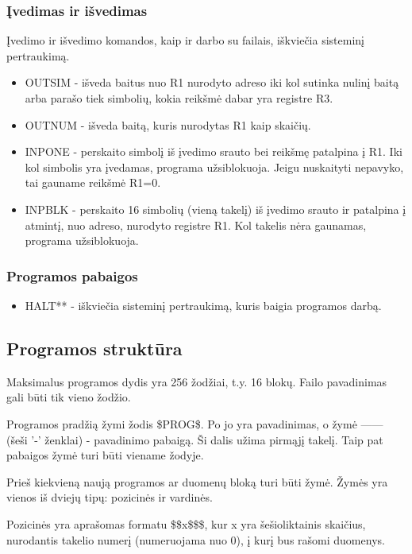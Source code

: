 \documentclass{VUMIFInfKursinis}
\begin{document}
\subsubsection{Įvedimas ir išvedimas}
Įvedimo ir išvedimo komandos, kaip ir darbo su failais, iškviečia sisteminį pertraukimą. 
\begin{itemize}
	\item OUTSIM - išveda baitus nuo R1 nurodyto adreso iki kol sutinka nulinį baitą arba parašo tiek simbolių, kokia reikšmė dabar yra registre R3.
	\item OUTNUM - išveda baitą, kuris nurodytas R1 kaip skaičių.
	\item INPONE - perskaito simbolį iš įvedimo srauto bei reikšmę patalpina į R1. Iki kol simbolis yra įvedamas, programa užsiblokuoja. Jeigu nuskaityti nepavyko, tai gauname reikšmė R1=0.
	\item INPBLK - perskaito 16 simbolių (vieną takelį) iš įvedimo srauto ir patalpina į atmintį, nuo adreso, nurodyto registre R1. Kol takelis nėra gaunamas, programa užsiblokuoja.
\end{itemize}

\subsubsection{Programos pabaigos}
\begin{itemize}
	\item HALT** - iškviečia sisteminį pertraukimą, kuris baigia programos darbą.
\end{itemize}

\subsection{Programos struktūra}

Maksimalus programos dydis yra 256 žodžiai, t.y. 16 blokų. Failo pavadinimas gali būti tik vieno žodžio.

Programos pradžią žymi žodis \$PROG\$. Po jo yra pavadinimas, o žymė ------ (šeši '-' ženklai) - pavadinimo pabaigą. Ši dalis užima pirmąjį takelį. Taip pat pabaigos žymė turi būti viename žodyje.

Prieš kiekvieną naują programos ar duomenų bloką turi būti žymė. Žymės yra vienos iš dviejų tipų: pozicinės ir vardinės.

Pozicinės yra aprašomas formatu \$\$x\$\$\$, kur x yra šešioliktainis skaičius, nurodantis takelio numerį (numeruojama nuo 0), į kurį bus rašomi duomenys.
\end{document}
